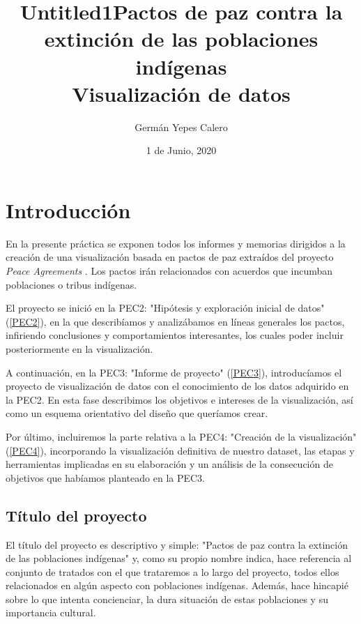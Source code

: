 \documentclass[11pt]{article}
\title{Untitled1}
\author{Germán Yepes Calero}
\title{Pactos de paz contra la extinción de las poblaciones indígenas
\\ \large Visualización de datos}
\date{1 de Junio, 2020}
\begin{document}
\maketitle

\pagebreak

{
  \hypersetup{linkcolor=black}
  \tableofcontents
}

\pagebreak 

\section{Introducción}

En la presente práctica se exponen todos los informes y memorias dirigidos a la creación de una visualización basada en pactos de paz extraídos del proyecto \emph{Peace Agreements} \cite{peace}. Los pactos irán relacionados con acuerdos que incumban poblaciones o tribus indígenas.

El proyecto se inició en la PEC2: "Hipótesis y exploración inicial de datos" (\ref{PEC2}), en la que describíamos y analizábamos 
en líneas generales los pactos, infiriendo conclusiones y comportamientos interesantes, los cuales poder incluir posteriormente en la visualización.

A continuación, en la PEC3: "Informe de proyecto" (\ref{PEC3}), introducíamos el proyecto de visualización de datos con el conocimiento de los datos adquirido en la PEC2. En esta fase describimos los objetivos e intereses de la visualización, así como un esquema orientativo del diseño que queríamos crear. 

Por último, incluiremos la parte relativa a la PEC4: "Creación de la visualización" (\ref{PEC4}), incorporando la visualización definitiva de nuestro dataset, las etapas y herramientas implicadas en su elaboración y un análisis de la consecución de objetivos que habíamos planteado en la PEC3.

\subsection{Título del proyecto}

El título del proyecto es descriptivo y simple: "Pactos de paz contra la extinción de las poblaciones indígenas" y, como su propio nombre indica, hace referencia al conjunto de tratados con el que trataremos a lo largo del proyecto, todos ellos relacionados en algún aspecto con poblaciones indígenas. Además, hace hincapié sobre lo que intenta concienciar, la dura situación de estas poblaciones y su importancia cultural.
\end{document}
